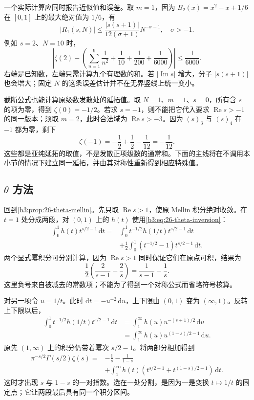 一个实际计算应同时报告近似值和误差。取 \(m=1\)，因为 \(B_2(x)=x^2-x+1/6\) 在 \([0,1]\) 上的最大绝对值为 \(1/6\)，有
\[
 |R_1(s,N)|\le
   \frac{|s(s+1)|}{12(\sigma+1)}N^{-\sigma-1},
 \quad \sigma>-1.
\]
例如 \(s=2\)、\(N=10\) 时，
\[
 \left|\zeta(2)-
   \left(\sum_{n=1}^{9}\frac1{n^2}+\frac1{10}
                   +\frac1{200}+\frac1{6000}\right)\right|
 \le\frac1{6000}.
\]
右端是已知数，左端只需计算九个有理数的和。若 \(|\operatorname{Im}s|\) 增大，分子 \(|s(s+1)|\) 也会增大；固定 \(N\) 的这条误差估计并不在无界竖线上统一变小。

\ProseParagraphBreak

截断公式也能计算原级数发散处的延拓值。取 \(N=1\)、\(m=1\)、\(s=0\)，所有含 \(s\) 的项为零，得到 \(\zeta(0)=-1/2\)。若求 \(s=-1\)，则不能把它代入要求 \(\operatorname{Re}s>-1\) 的同一版本；须取 \(m=2\)，此时合法域为 \(\operatorname{Re}s>-3\)。因为 \((s)_3\) 与 \((s)_4\) 在 \(-1\) 都为零，剩下
\[
 \zeta(-1)=-\frac12+\frac12-\frac1{12}=-\frac1{12}.
\]
这些都是亚纯延拓的取值，不是发散正项级数的通常和。下面的主线将在不调用本小节的情况下建立同一延拓，并由其对称性重新得到相应特殊值。

\subsection{\texorpdfstring{\(\theta\)}{\AnalysisPdfTheta} 方法}
\label{b3:subsec:260302}

回到\cref{b3:prop:26-theta-mellin}。先只取 \(\operatorname{Re}s>1\)，使原 Mellin 积分绝对收敛。在 \(t=1\) 处分成两段，对 \((0,1)\) 上的 \(h(t)\) 使用\eqref{b3:eq:26-theta-inversion}：
\[
 \begin{aligned}
 \int_0^1h(t)t^{s/2-1}\,\mathrm dt
 ={}&\int_0^1 t^{-1/2}h(1/t)t^{s/2-1}\,\mathrm dt\\
 &+\frac12\int_0^1
       \left(t^{-1/2}-1\right)t^{s/2-1}\,\mathrm dt.
 \end{aligned}
\]
两个显式幂积分可分别计算，因为 \(\operatorname{Re}s>1\) 同时保证它们在原点可积，结果为
\[
 \frac12\left(\frac2{s-1}-\frac2s\right)
 =\frac1{s-1}-\frac1s.
\]
这里负号来自被减去的常数项；不能为了得到一个对称公式而省略符号核算。

\ProseParagraphBreak

对另一项令 \(u=1/t\)。此时 \(\mathrm dt=-u^{-2}\,\mathrm du\)，上下限由 \((0,1)\) 变为 \((\infty,1)\)。反转上下限以后，
\[
 \begin{aligned}
 \int_0^1t^{-1/2}h(1/t)t^{s/2-1}\,\mathrm dt
 &=\int_1^\infty h(u)u^{-(s+1)/2}\,\mathrm du\\
 &=\int_1^\infty h(u)u^{(1-s)/2-1}\,\mathrm du.
 \end{aligned}
\]
原先 \((1,\infty)\) 上的积分仍带着幂次 \(s/2-1\)。将两部分相加得到
\begin{equation}\label{b3:eq:26-completed-integral}
 \begin{aligned}
 \pi^{-s/2}\Gamma(s/2)\zeta(s)
 ={}&-\frac1s-\frac1{1-s}\\
 &+\int_1^\infty h(t)
      \left(t^{s/2-1}+t^{(1-s)/2-1}\right)\,\mathrm dt.
 \end{aligned}
\end{equation}
这时才出现 \(s\) 与 \(1-s\) 的一对指数。选在一处分割，是因为一是变换 \(t\mapsto1/t\) 的固定点；它让两段最后具有同一个积分区间。

